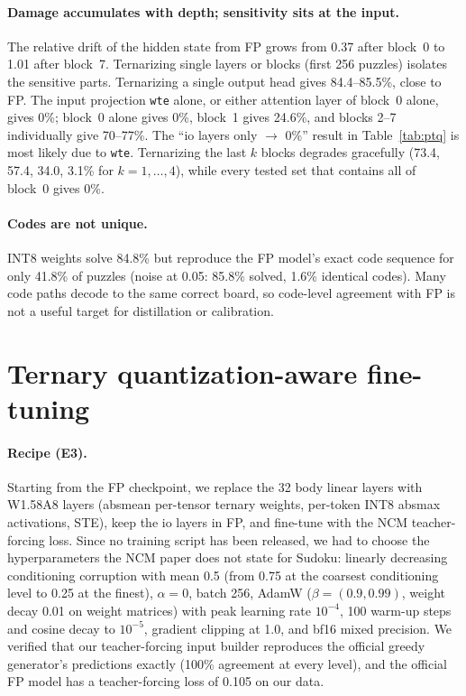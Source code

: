\documentclass[11pt]{article}
\begin{document}
\paragraph{Damage accumulates with depth; sensitivity sits at the input.}
The relative drift of the hidden state from FP grows from 0.37 after block~0 to 1.01 after block~7.
Ternarizing single layers or blocks (first 256 puzzles) isolates the sensitive parts. Ternarizing a single output
head gives 84.4--85.5\%, close to FP. The input projection \texttt{wte} alone, or either attention layer of
block~0 alone, gives 0\%; block~0 alone gives 0\%, block~1 gives 24.6\%, and blocks 2--7 individually give
70--77\%. The ``io layers only $\to$ 0\%'' result in Table~\ref{tab:ptq} is most likely due to \texttt{wte}.
Ternarizing the last $k$ blocks degrades gracefully (73.4, 57.4, 34.0, 3.1\% for $k=1,\dots,4$), while every
tested set that contains all of block~0 gives 0\%.

\paragraph{Codes are not unique.}
INT8 weights solve 84.8\% but reproduce the FP model's exact code sequence for only 41.8\% of puzzles (noise at
0.05: 85.8\% solved, 1.6\% identical codes). Many code paths decode to the same correct board, so code-level
agreement with FP is not a useful target for distillation or calibration.

\section{Ternary quantization-aware fine-tuning}
\label{sec:qat}

\paragraph{Recipe (E3).}
Starting from the FP checkpoint, we replace the 32 body linear layers with W1.58A8 layers (absmean per-tensor
ternary weights, per-token INT8 absmax activations, STE), keep the io layers in FP, and fine-tune with the NCM
teacher-forcing loss. Since no training script has been released, we had to choose the hyperparameters the NCM
paper does not state for Sudoku: linearly decreasing conditioning corruption with mean 0.5 (from 0.75 at the
coarsest conditioning level to 0.25 at the finest), $\alpha=0$, batch 256, AdamW ($\beta=(0.9,0.99)$, weight
decay 0.01 on weight matrices) with peak learning rate $10^{-4}$, 100 warm-up steps and cosine decay to
$10^{-5}$, gradient clipping at 1.0, and bf16 mixed precision. We verified that our teacher-forcing input builder
reproduces the official greedy generator's predictions exactly (100\% agreement at every level), and the official
FP model has a teacher-forcing loss of 0.105 on our data.
\end{document}
